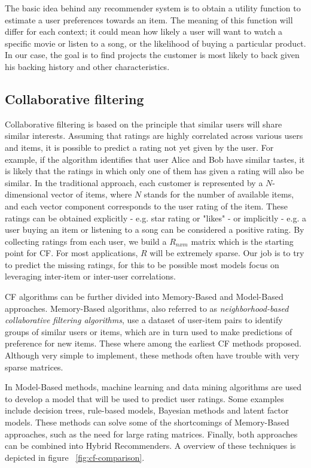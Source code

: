 \documentclass[cic,tc,english]{iiufrgs}
\begin{document}
The basic idea behind any recommender system is to obtain a utility function to estimate a user preferences towards an item. The meaning of this function will differ for each context; it could mean how likely a user will want to watch a specific movie or listen to a song, or the likelihood of buying a particular product. In our case, the goal is to find projects the customer is most likely to back given his backing history and other characteristics. 


\subsection{Collaborative filtering}
Collaborative filtering is based on the principle that similar users will share similar interests. Assuming that ratings are highly correlated across various users and items, it is possible to predict a rating not yet given by the user. For example, if the algorithm identifies that user Alice and Bob have similar tastes, it is likely that the ratings in which only one of them has given a rating will also be similar. In the traditional approach, each customer is represented by a \(N\)-dimensional vector of items, where \(N\) stands for the number of available items, and each vector component corresponds to the user rating of the item. These ratings can be obtained explicitly - e.g. star rating or "likes" - or implicitly - e.g. a user buying an item or listening to a song can be considered a positive rating. By collecting ratings from each user, we build a \(R_{nxm}\) matrix which is the starting point for CF. For most applications, \(R\) will be extremely sparse. Our job is to try to predict the missing ratings, for this to be possible most models focus on leveraging inter-item or inter-user correlations.

CF algorithms can be further divided into Memory-Based and Model-Based approaches. Memory-Based algorithms, also referred to as \textit{neighborhood-based collaborative filtering algorithms}, use a dataset of user-item pairs to identify groups of similar users or items, which are in turn used to make predictions of preference for new items. These where among the earliest CF methods proposed. Although very simple to implement, these methods often have trouble with very sparse matrices.

In Model-Based methods, machine learning and data mining algorithms are used to develop a model that will be used to predict user ratings. Some examples include decision trees, rule-based models, Bayesian methods and latent factor models. These methods can solve some of the shortcomings of Memory-Based approaches, such as the need for large rating matrices. Finally, both approaches can be combined into Hybrid Recommenders. A overview of these techniques is depicted in figure ~\ref{fig:cf-comparison}.
\end{document}
